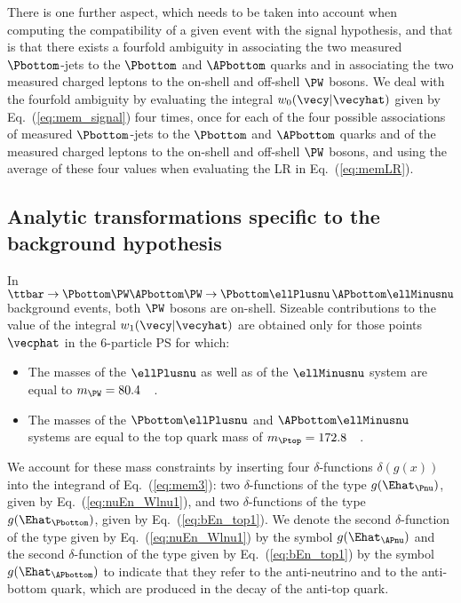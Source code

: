 There is one further aspect, which needs to be taken into account when computing the compatibility of a given event with the signal hypothesis,
and that is that there exists a fourfold ambiguity in associating the two measured $\Pbottom$-jets to the $\Pbottom$ and $\APbottom$ quarks 
and in associating the two measured charged leptons to the on-shell and off-shell $\PW$ bosons.
We deal with the fourfold ambiguity by evaluating the integral $w_{0}(\vecy|\vecyhat)$ given by Eq.~(\ref{eq:mem_signal}) four times,
once for each of the four possible associations of measured $\Pbottom$-jets to the $\Pbottom$ and $\APbottom$ quarks and of the measured charged leptons to the on-shell and off-shell $\PW$ bosons,
and using the average of these four values when evaluating the LR in Eq.~(\ref{eq:memLR}).


\subsection{Analytic transformations specific to the background hypothesis}
\label{sec:mem_background}

In $\ttbar \to \Pbottom\PW\APbottom\PW \to \Pbottom\ellPlusnu \, \APbottom\ellMinusnu$ background events,
both $\PW$ bosons are on-shell. Sizeable contributions to the value of the integral $w_{1}(\vecy|\vecyhat)$ are obtained only
for those points $\vecphat$ in the $6$-particle PS for which:
\begin{itemize}
\item The masses of the $\ellPlusnu$ as well as of the $\ellMinusnu$ system are equal to $m_{\PW} = 80.4$~\GeV~\cite{PDG}.
\item The masses of the $\Pbottom\ellPlusnu$ and $\APbottom\ellMinusnu$ systems are equal to the top quark mass of $m_{\Ptop} = 172.8$~\GeV~\cite{PDG}.
\end{itemize}

We account for these mass constraints by inserting four $\delta$-functions $\delta\left( g(x) \right)$ into the integrand of Eq.~(\ref{eq:mem3}):
two $\delta$-functions of the type $g(\Ehat_{\Pnu})$, given by Eq.~(\ref{eq:nuEn_Wlnu1}),
and two $\delta$-functions of the type $g(\Ehat_{\Pbottom})$, given by Eq.~(\ref{eq:bEn_top1}).
We denote the second $\delta$-function of the type given by Eq.~(\ref{eq:nuEn_Wlnu1}) by the symbol $g(\Ehat_{\APnu})$
and the second $\delta$-function of the type given by Eq.~(\ref{eq:bEn_top1}) by the symbol $g(\Ehat_{\APbottom})$
to indicate that they refer to the anti-neutrino and to the anti-bottom quark, which are produced in the decay of the anti-top quark.


